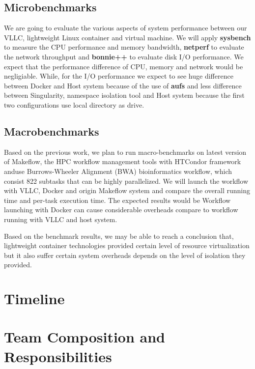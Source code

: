 \documentclass{article}
\begin{document}
\subsection{Microbenchmarks}

We are going to evaluate the various aspects of system performance between our VLLC, 
lightweight Linux container and virtual machine. We will apply \textbf{sysbench} to measure the CPU 
performance and memory bandwidth, \textbf{netperf} to evaluate the network throughput and \textbf{bonnie++} 
to evaluate disk I/O performance. We expect that the performance difference of CPU, memory and network would 
be negligiable. While, for the I/O performance we expect to see huge difference between Docker and Host 
system because of the use of \textbf{aufs} and less difference between Singularity, namespace isolation tool and
Host system because the first two configurations use local directory as drive.

\subsection{Macrobenchmarks}

Based on the previous work\cite{zheng2015integrating}, we plan to run macro-benchmarks on latest version of Makeflow, 
the HPC workflow management tools with HTCondor framework anduse Burrows-Wheeler Alignment (BWA) 
bioinformatics workflow, which consist 822 subtasks that can be highly parallelized. We will launch 
the workflow with VLLC, Docker and origin Makeflow system and compare the overall running time and per-task execution time.
The expected results would be Workflow launching with Docker can cause considerable overheads compare to workflow
running with VLLC and host system.

\medskip

Based on the benchmark results, we may be able to reach a conclusion that, lightweight container technologies 
provided certain level of resource virtualization but it also suffer certain system overheads depends on the level
of isolation they provided.

\section{Timeline}

\section{Team Composition and Responsibilities}






\end{document}
